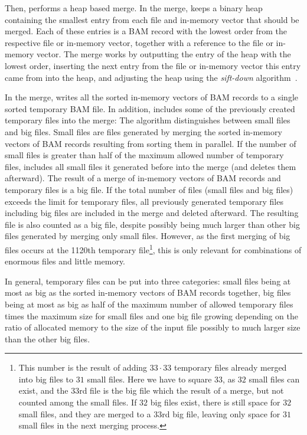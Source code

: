 Then, \sort performs a heap based merge. In the merge, \sort keeps a binary heap containing the smallest entry from each file and in-memory vector that should be merged. Each of these entries is a BAM record with the lowest order from the respective file or in-memory vector, together with a reference to the file or in-memory vector. The merge works by outputting the entry of the heap with the lowest order, inserting the next entry from the file or in-memory vector this entry came from into the heap, and adjusting the heap using the \textit{sift-down} algorithm~\cite{bojesen_performance_1999}. 

In the merge, \sort writes all the sorted in-memory vectors of BAM records to a single sorted temporary BAM file. In addition, \sort includes some of the previously created temporary files into the merge: The algorithm distinguishes between small files and big files. Small files are files generated by merging the sorted in-memory vectors of BAM records resulting from sorting them in parallel. If the number of small files is greater than half of the maximum allowed number of temporary files, \sort includes all small files it generated before into the merge (and deletes them afterward). The result of a merge of in-memory vectors of BAM records and temporary files is a big file. If the total number of files (small files and big files) exceeds the limit for temporary files, all previously generated temporary files including big files are included in the merge and deleted afterward. The resulting file is also counted as a big file, despite possibly being much larger than other big files generated by merging only small files. However, as the first merging of big files occurs at the 1120th temporary file\footnote{\label{limitReaching}This number is the result of adding $33 \cdot 33$ temporary files already merged into big files to $31$ small files. Here we have to square $33$, as $32$ small files can exist, and the $33$rd file is the big file which the result of a merge, but not counted among the small files. If $32$ big files exist, there is still space for $32$ small files, and they are merged to a $33$rd big file, leaving only space for $31$ small files in the next merging process.}, this is only relevant for combinations of enormous files and little memory. 

In general, temporary files can be put into three categories: small files being at most as big as the sorted in-memory vectors of BAM records together, big files being at most as big as half of the maximum number of allowed temporary files times the maximum size for small files and one big file growing depending on the ratio of allocated memory to the size of the input file possibly to much larger size than the other big files.

